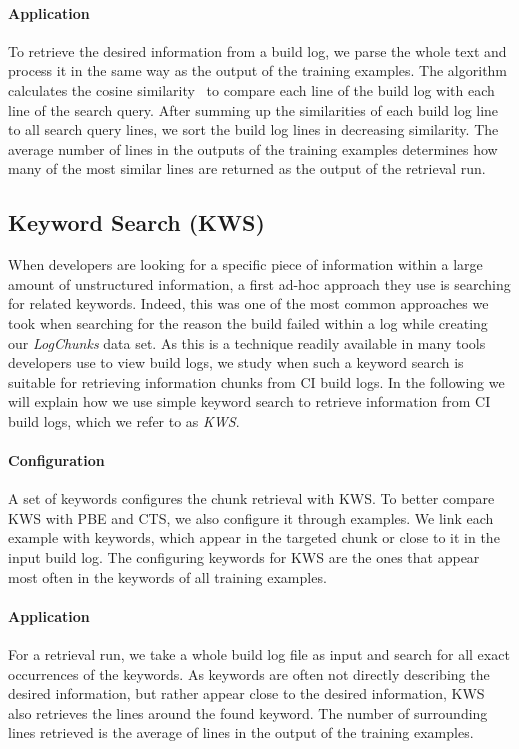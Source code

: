 \documentclass[\myrootdir/main.tex]{subfiles}
\begin{document}
\paragraph{Application}
To retrieve the desired information from a build log, we parse the whole text and process it in the same way as the output of the training examples.
The algorithm calculates the cosine similarity~\cite{korenius2007principal} to compare each line of the build log with each line of the search query.
After summing up the similarities of each build log line to all search query lines, we sort the build log lines in decreasing similarity.
The average number of lines in the outputs of the training examples determines how many of the most similar lines are returned as the output of the retrieval run.

\subsection{Keyword Search (KWS)}
\label{sec:expl-skws}
When developers are looking for a specific piece of information within a large amount of unstructured information, a first ad-hoc approach they use is searching for related keywords.
Indeed, this was one of the most common approaches we took when searching for the reason the build failed within a log while creating our \emph{LogChunks} data set.
As this is a technique readily available in many tools developers use to view build logs, we study when such a keyword search is suitable for retrieving information chunks from CI build logs.
In the following we will explain how we use simple keyword search to retrieve information from CI build logs, which we refer to as \emph{KWS}\@.

\paragraph{Configuration}
A set of keywords configures the chunk retrieval with KWS\@.
To better compare KWS with PBE and CTS, we also configure it through examples.
We link each example with keywords, which appear in the targeted chunk or close to it in the input build log.
The configuring keywords for KWS are the ones that appear most often in the keywords of all training examples.

\paragraph{Application}
For a retrieval run, we take a whole build log file as input and search for all exact occurrences of the keywords.
As keywords are often not directly describing the desired information, but rather appear close to the desired information, KWS also retrieves the lines around the found keyword.
The number of surrounding lines retrieved is the average of lines in the output of the training examples.
\end{document}
